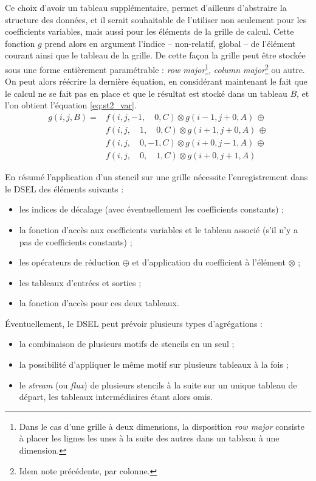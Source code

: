 Ce choix d'avoir un tableau supplémentaire, permet d'ailleurs d'abstraire la structure des données, et il serait souhaitable de l'utiliser non seulement pour les coefficients variables, mais aussi pour les éléments de la grille de calcul. Cette fonction $g$ prend alors en argument l'indice -- non-relatif, global -- de l'élément courant ainsi que le tableau de la grille. De cette façon la grille peut être stockée sous une forme entièrement paramétrable : \emph{row major}\footnote{Dans le cas d'une grille à deux dimensions, la disposition \emph{row major} consiste à placer les lignes les unes à la suite des autres dans un tableau à une dimension.}, \emph{column major}\footnote{Idem note précédente, par colonne.} ou autre. On peut alors réécrire la dernière équation, en considérant maintenant le fait que le calcul ne se fait pas en place et que le résultat est stocké dans un tableau $B$, et l'on obtient l'équation \ref{eq:st2_var}.
\begin{equation}
\label{eq:st2_var}
\begin{aligned}
g(i,j,B) = & f(i, j, -1, \quad 0, C) \otimes g(i-1, j+0, A) \, \oplus \\
           & f(i, j, \quad 1, \quad 0, C) \otimes g(i+1,j+0, A) \, \oplus \\
           & f(i, j, \quad 0, -1, C) \otimes g(i+0,j-1, A) \, \oplus \\ 
           & f(i, j, \quad 0, \quad 1, C) \otimes g(i+0,j+1, A)
\end{aligned}
\end{equation}

En résumé l'application d'un stencil sur une grille nécessite l'enregistrement dans le DSEL des éléments suivants : 
\begin{itemize}
\item les indices de décalage (avec éventuellement les coefficients constants) ;
\item la fonction d'accès aux coefficients variables et le tableau associé (s'il n'y a pas de coefficients constants) ;
\item les opérateurs de réduction $\oplus$ et d'application du coefficient à l'élément $\otimes$ ;
\item les tableaux d'entrées et sorties ;
\item la fonction d'accès pour ces deux tableaux.
\end{itemize}

Éventuellement, le DSEL peut prévoir plusieurs types d'agrégations :
\begin{itemize}
\item la combinaison de plusieurs motifs de stencils en un seul ;
\item la possibilité d'appliquer le même motif sur plusieurs tableaux à la fois ;
\item le \emph{stream} (ou \emph{flux}) de plusieurs stencils à la suite sur un unique tableau de départ, les tableaux intermédiaires étant alors omis.
\end{itemize}

